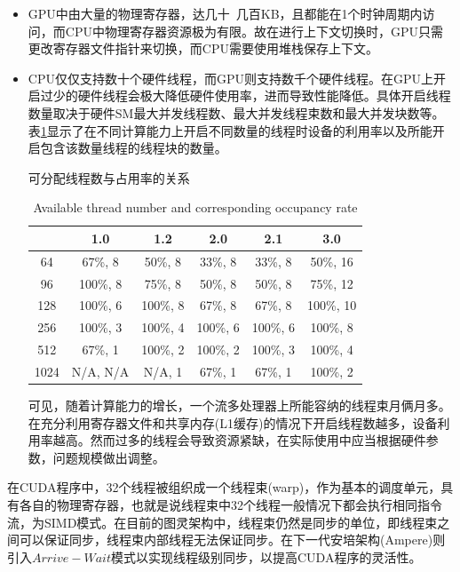 \begin{itemize}
	\item GPU中由大量的物理寄存器，达几十~几百KB，且都能在1个时钟周期内访问，而CPU中物理寄存器资源极为有限。故在进行上下文切换时，GPU只需更改寄存器文件指针来切换，而CPU需要使用堆栈保存上下文。
	\item CPU仅仅支持数十个硬件线程，而GPU则支持数千个硬件线程。在GPU上开启过少的硬件线程会极大降低硬件使用率，进而导致性能降低。具体开启线程数量取决于硬件SM最大并发线程数、最大并发线程束数和最大并发块数等。表\ref{table-占用率}显示了在不同计算能力上开启不同数量的线程时设备的利用率以及所能开启包含该数量线程的线程块的数量。\\
	\begin{table}
	\centering
	\renewcommand{\thetable}{\arabic{section}-\arabic{table} }
	\renewcommand{\tablename}{表}
	\caption{可分配线程数与占用率的关系}
	\addtocounter{table}{-1}
	\renewcommand{\thetable}{\arabic{section}-\arabic{table} }
	\renewcommand{\tablename}{Table}
	\caption{Available thread number and corresponding occupancy rate}
	\begin{tabular}{cccccc}
		\toprule
			&	1.0	&1.2	&2.0	&2.1	&3.0 \\
		\midrule
		64	&	67\%, 8		&	50\%, 8		&	33\%, 8		&	33\%, 8		&	50\%, 16	\\
		96	&	100\%, 8	&	75\%, 8		&	50\%, 8		&	50\%, 8		&	75\%, 12	\\
		128	&	100\%, 6	&	100\%, 8	&	67\%, 8		&	67\%, 8		&	100\%, 10	\\
		256	&	100\%, 3	&	100\%, 4	&	100\%, 6	&	100\%, 6	&	100\%, 8	\\
		512	&	67\%, 1		&	100\%, 2	&	100\%, 2	&	100\%, 3	&	100\%, 4	\\
		1024&	N/A, N/A	&	N/A, 1		&	67\%, 1		&	67\%, 1		&	100\%, 2	\\
		
		\bottomrule
	\end{tabular} \label{table-占用率}
	\end{table}
	可见，随着计算能力的增长，一个流多处理器上所能容纳的线程束月俩月多。在充分利用寄存器文件和共享内存(L1缓存)的情况下开启线程数越多，设备利用率越高。然而过多的线程会导致资源紧缺，在实际使用中应当根据硬件参数，问题规模做出调整。
\end{itemize}
\par 在CUDA程序中，32个线程被组织成一个线程束(warp)，作为基本的调度单元，具有各自的物理寄存器，也就是说线程束中32个线程一般情况下都会执行相同指令流，为SIMD模式。在目前的图灵架构中，线程束仍然是同步的单位，即线程束之间可以保证同步，线程束内部线程无法保证同步。在下一代安培架构(Ampere)则引入$ Arrive-Wait $模式以实现线程级别同步，以提高CUDA程序的灵活性。 
